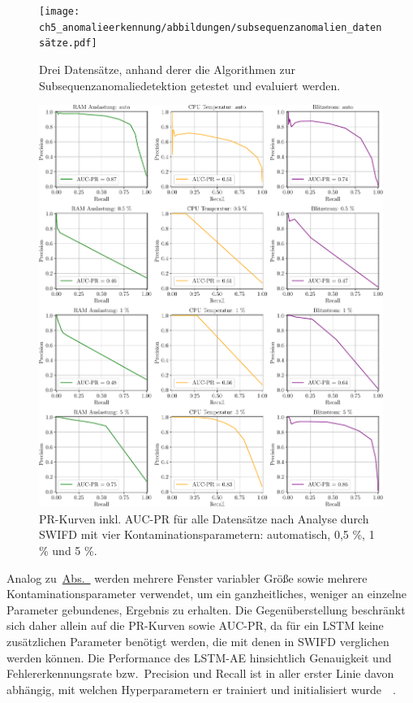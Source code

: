 \begin{figure}[b!]
    \centering
        \texttt{[image: ch5\_anomalieerkennung/abbildungen/subsequenzanomalien\_datensätze.pdf]}
    \caption{\centering Drei Datensätze, anhand derer die Algorithmen zur Subsequenzanomaliedetektion getestet und evaluiert werden.}
    \label{fig:subsequenz_datensätze}
\end{figure}

\begin{figure}[t!]
    \centering
        \includegraphics[width=1\linewidth]{ch5_anomalieerkennung/abbildungen/SWIFD_PR_AUC_PR.pdf}
    \caption{\centering PR-Kurven inkl. AUC-PR für alle Datensätze nach Analyse durch SWIFD mit vier Kontaminationsparametern:
    automatisch, 0,5 \%, 1 \% und 5 \%.}
    \label{fig:SWIFD_AUC_PR}
\end{figure}

Analog zu~\hyperref[sec:punktanomaliedetektion]{Abs.~} werden mehrere Fenster variabler Größe sowie mehrere
Kontaminationsparameter verwendet, um ein ganzheitliches, weniger an einzelne Parameter gebundenes, Ergebnis zu erhalten. Die Gegenüberstellung
beschränkt sich daher allein auf die PR-Kurven sowie AUC-PR, da für ein LSTM keine zusätzlichen Parameter benötigt werden, die mit denen
in SWIFD verglichen werden können. Die Performance des LSTM-AE hinsichtlich Genauigkeit und Fehlererkennungsrate bzw.~Precision und Recall
ist in aller erster Linie davon abhängig, mit welchen Hyperparametern er trainiert und initialisiert wurde~\cite{Wei2022}~\cite{Lachekhab2024}.

